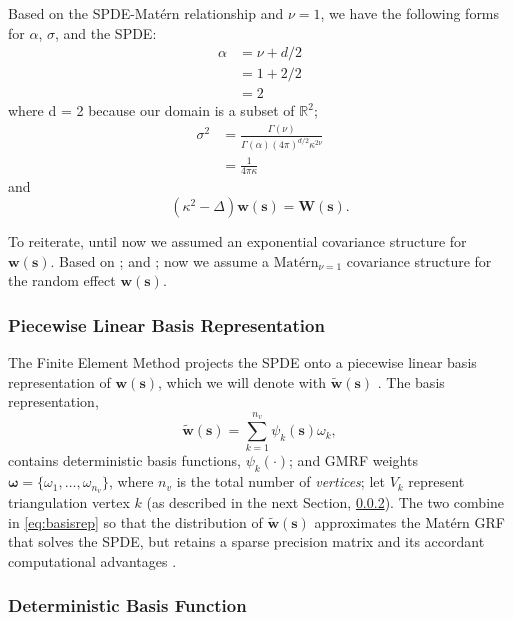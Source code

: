 Based on the SPDE-Mat\'ern relationship and $\nu = 1$, we have the following forms for $\alpha$, $\sigma$, and the SPDE:
\begin{align}
\alpha &= \nu + d/2 \nonumber \\
&= 1 +2/2 \nonumber \\
&= 2 \nonumber
\end{align}
where d = 2 because our domain is a subset of $\mathbb{R}^{2}$;
\begin{align}
\sigma^{2} &= \frac{\Gamma(\nu)}{\Gamma(\alpha)(4\pi)^{d/2}\kappa^{2\nu}} \nonumber \nonumber \\
&= \frac{1}{4 \pi \kappa} \nonumber
\end{align}
and 
\begin{equation} \label{eq:spde}
(\kappa^{2} - \Delta)\pmb{w}(\pmb{s}) = \pmb{W}(\pmb{s}).
\end{equation}

To reiterate, until now we assumed an exponential covariance structure for $\pmb{w}(\pmb{s})$. Based on \cite{Whittle1954}; \cite{Mondal2017} and \cite{Lindgren2015}; now we assume a $\text{Mat\'ern}_{\nu = 1}$ covariance structure for the random effect $\pmb{w}(\pmb{s})$. 

\subsubsection{Piecewise Linear Basis Representation}
The Finite Element Method projects the SPDE onto a piecewise linear basis representation of $\pmb{w}(\pmb{s})$, which we will denote with $\widetilde{\pmb{w}}(\pmb{s})$ \citep{Simpson2012}. The basis representation,
\begin{equation} \label{eq:basisrep}
\widetilde{\pmb{w}}(\pmb{s}) = \sum_{k=1}^{n_{v}} \psi_{k}(\pmb{s})\omega_{k},
\end{equation}
contains deterministic basis functions, $\psi_{k}(\cdot)$; and GMRF weights $\pmb{\omega} = \{\omega_{1},\dots,\omega_{n_{v}}\}$, where $n_{v}$ is the total number of {\it vertices}; let $V_{k}$ represent triangulation vertex $k$ (as described in the next Section, \ref{dbf}). The two combine in \ref{eq:basisrep} so that the distribution of $\widetilde{\pmb{w}}(\pmb{s})$ approximates the Mat\'ern GRF that solves the SPDE, but retains a sparse precision matrix and its accordant computational advantages \citep{Lindgren2011}. 

\subsubsection{Deterministic Basis Function} \label{dbf} %

